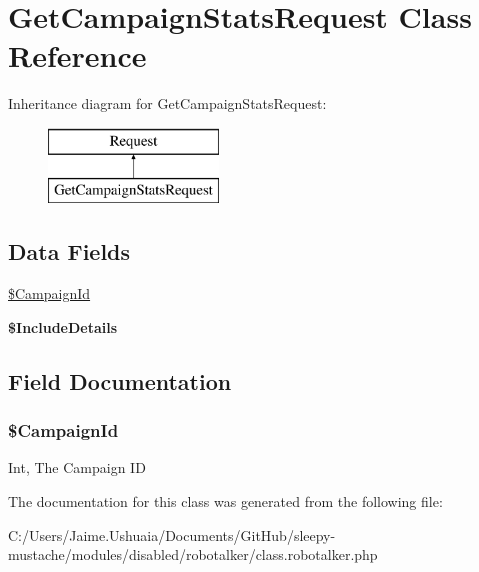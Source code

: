 \hypertarget{class_get_campaign_stats_request}{\section{Get\-Campaign\-Stats\-Request Class Reference}
\label{class_get_campaign_stats_request}
}
Inheritance diagram for Get\-Campaign\-Stats\-Request\-:\begin{figure}[H]
\begin{center}
\leavevmode
\includegraphics[height=2.000000cm]{class_get_campaign_stats_request}
\end{center}
\end{figure}
\subsection*{Data Fields}
\begin{DoxyCompactItemize}
\item 
\hyperlink{class_get_campaign_stats_request_a2d22a3b5dcd66a7b8cc5db60947b5ca3}{\$\-Campaign\-Id}
\item 
\hypertarget{class_get_campaign_stats_request_a6a7dc0605d9a2e10066aeb57b77fc272}{{\bfseries \$\-Include\-Details}}\label{class_get_campaign_stats_request_a6a7dc0605d9a2e10066aeb57b77fc272}

\end{DoxyCompactItemize}


\subsection{Field Documentation}
\hypertarget{class_get_campaign_stats_request_a2d22a3b5dcd66a7b8cc5db60947b5ca3}{
\subsubsection[{\$\-Campaign\-Id}]{\setlength{\rightskip}{0pt plus 5cm}\$Campaign\-Id}}\label{class_get_campaign_stats_request_a2d22a3b5dcd66a7b8cc5db60947b5ca3}
Int, The Campaign I\-D 

The documentation for this class was generated from the following file\-:\begin{DoxyCompactItemize}
\item 
C\-:/\-Users/\-Jaime.\-Ushuaia/\-Documents/\-Git\-Hub/sleepy-\/mustache/modules/disabled/robotalker/class.\-robotalker.\-php\end{DoxyCompactItemize}
